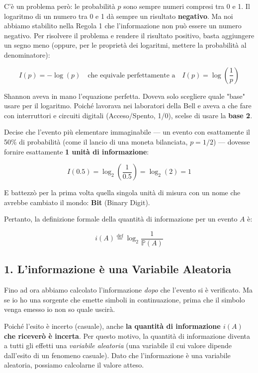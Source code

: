 C'è un problema però: le probabilità $p$ sono sempre numeri compresi tra 0 e 1. Il logaritmo di un numero tra 0 e 1 dà sempre un risultato \textbf{negativo}. Ma noi abbiamo stabilito nella Regola 1 che l'informazione non può essere un numero negativo. Per risolvere il problema e rendere il risultato positivo, basta aggiungere un segno meno (oppure, per le proprietà dei logaritmi, mettere la probabilità al denominatore):

\begin{equation*}
I(p) = -\log(p) \quad \text{che equivale perfettamente a} \quad I(p) = \log\left(\frac{1}{p}\right)
\end{equation*}

Shannon aveva in mano l'equazione perfetta. Doveva solo scegliere quale "base" usare per il logaritmo. Poiché lavorava nei laboratori della Bell e aveva a che fare con interruttori e circuiti digitali (Acceso/Spento, 1/0), scelse di usare la \textbf{base 2}.

Decise che l'evento più elementare immaginabile — un evento con esattamente il 50\% di probabilità (come il lancio di una moneta bilanciata, $p = 1/2$) — dovesse fornire esattamente \textbf{1 unità di informazione}:

\begin{equation*}
I(0.5) = \log_2\left(\frac{1}{0.5}\right) = \log_2(2) = 1
\end{equation*}

E battezzò per la prima volta quella singola unità di misura con un nome che avrebbe cambiato il mondo: \textbf{Bit} (Binary Digit).

Pertanto, la definizione formale della quantità di informazione per un evento $A$ è:

\begin{equation}
\boxed{ i(A) \overset{\text{def}}{=} \log_2 \frac{1}{\mathbb{P}(A)} }
\end{equation}

\subsection{1. L'informazione è una Variabile Aleatoria}

Fino ad ora abbiamo calcolato l'informazione \textit{dopo} che l'evento si è verificato. Ma se io ho una sorgente che emette simboli in continuazione, prima che il simbolo venga emesso io non so quale uscirà.

Poiché l'esito è incerto (casuale), anche \textbf{la quantità di informazione $i(A)$ che riceverò è incerta}. Per questo motivo, la quantità di informazione diventa a tutti gli effetti una \textit{variabile aleatoria} (una variabile il cui valore dipende dall'esito di un fenomeno casuale).
Dato che l'informazione è una variabile aleatoria, possiamo calcolarne il valore atteso.

